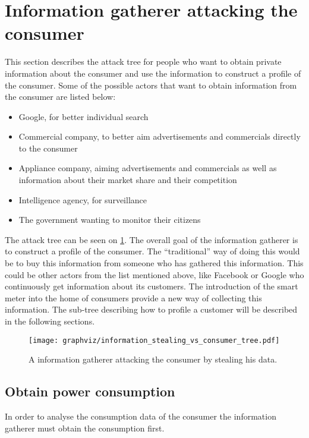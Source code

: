 \section{Information gatherer attacking the consumer}\label{informationGathererVsConsumer}
This section describes the attack tree for people who want to obtain private information about the consumer and use the information to construct a profile of the consumer.
Some of the possible actors that want to obtain information from the consumer are listed below:
\begin{itemize}
\item Google, for better individual search
\item Commercial company, to better aim advertisements and commercials directly to the consumer
\item Appliance company, aiming advertisements and commercials as well as information about their market share and their competition
\item Intelligence agency, for surveillance
\item The government wanting to monitor their citizens
\end{itemize}

The attack tree can be seen on \cref{information_stealing_tree}.
The overall goal of the information gatherer is to construct a profile of the consumer.
The ``traditional'' way of doing this would be to buy this information from someone who has gathered this information.
This could be other actors from the list mentioned above, like Facebook or Google who continuously get information about its customers.
The introduction of the smart meter into the home of consumers provide a new way of collecting this information.
The sub-tree describing how to profile a customer will be described in the following sections.


\begin{figure}
  \begin{center}
    \texttt{[image: graphviz/information\_stealing\_vs\_consumer\_tree.pdf]}
  \end{center}
  \caption{A information gatherer attacking the consumer by stealing his data.}
  \label{information_stealing_tree}
\end{figure}

\subsection{Obtain power consumption}
In order to analyse the consumption data of the consumer the information gatherer must obtain the consumption first.

